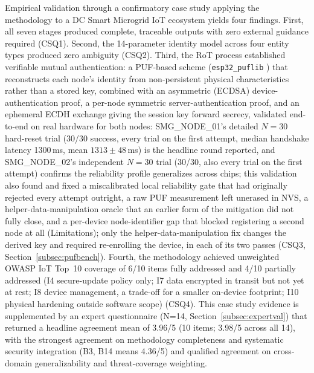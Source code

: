 \documentclass[preprint,12pt,authoryear]{elsarticle}
\begin{document}
Empirical validation through a confirmatory case study \citep{yin2014case} applying the methodology to a DC Smart Microgrid IoT ecosystem yields four findings. First, all seven stages produced complete, traceable outputs with zero external guidance required (CSQ1). Second, the 14-parameter identity model across four entity types produced zero ambiguity (CSQ2). Third, the RoT process established verifiable mutual authentication: a PUF-based scheme (\texttt{esp32\_puflib} \citep{stanicek2022esp32puflib}) that reconstructs each node's identity from non-persistent physical characteristics rather than a stored key, combined with an asymmetric (ECDSA) device-authentication proof, a per-node symmetric server-authentication proof, and an ephemeral ECDH exchange giving the session key forward secrecy, validated end-to-end on real hardware for both nodes: SMG\_NODE\_01's detailed $N=30$ hard-reset trial (30/30 success, every trial on the first attempt, median handshake latency 1300\,ms, mean $1313 \pm 48$\,ms) is the headline round reported, and SMG\_NODE\_02's independent $N=30$ trial (30/30, also every trial on the first attempt) confirms the reliability profile generalizes across chips; this validation also found and fixed a miscalibrated local reliability gate that had originally rejected every attempt outright, a raw PUF measurement left unerased in NVS, a helper-data-manipulation oracle that an earlier form of the mitigation did not fully close, and a per-device node-identifier gap that blocked registering a second node at all (Limitations); only the helper-data-manipulation fix changes the derived key and required re-enrolling the device, in each of its two passes (CSQ3, Section~\ref{subsec:pufbench}). Fourth, the methodology achieved unweighted OWASP IoT Top~10 coverage of 6/10 items fully addressed and 4/10 partially addressed (I4 secure-update policy only; I7 data encrypted in transit but not yet at rest; I8 device management, a trade-off for a smaller on-device footprint; I10 physical hardening outside software scope) (CSQ4). This case study evidence is supplemented by an expert questionnaire (N=14, Section~\ref{subsec:expertval}) that returned a headline agreement mean of 3.96/5 (10 items; 3.98/5 across all 14), with the strongest agreement on methodology completeness and systematic security integration (B3, B14 means 4.36/5) and qualified agreement on cross-domain generalizability and threat-coverage weighting.
\end{document}
